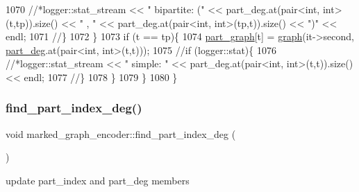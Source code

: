 \begin{DoxyCode}
1070       \textcolor{comment}{//*logger::stat\_stream << " bipartite: (" << part\_deg.at(pair<int, int> (t,tp)).size() << " , " <<
       part\_deg.at(pair<int, int>(tp,t)).size() << ")" << endl;}
1071       \textcolor{comment}{//\}}
1072     \}
1073     \textcolor{keywordflow}{if} (t == tp)\{
1074       \hyperlink{classmarked__graph__encoder_adbafd0769ae301acc1b2c19b5e1d4844}{part\_graph}[t] = \hyperlink{classgraph}{graph}(it->second, \hyperlink{classmarked__graph__encoder_a55ea2edb2609dfc287432f61900d6ad1}{part\_deg}.at(pair<int, int>(t,t)));
1075       \textcolor{comment}{//if (logger::stat)\{}
1076       \textcolor{comment}{//*logger::stat\_stream << " simple: "  << part\_deg.at(pair<int, int>(t,t)).size() << endl;}
1077       \textcolor{comment}{//\}}
1078     \}
1079   \}
1080 \}
\end{DoxyCode}
\mbox{\label{classmarked__graph__encoder_a1cb2cd754108302a0437a924dc70bc0e}} 
\subsubsection{\texorpdfstring{find\+\_\+part\+\_\+index\+\_\+deg()}{find\_part\_index\_deg()}}
{\footnotesize\ttfamily void marked\+\_\+graph\+\_\+encoder\+::find\+\_\+part\+\_\+index\+\_\+deg (\begin{DoxyParamCaption}{ }\end{DoxyParamCaption})\hspace{0.3cm}{\ttfamily [private]}}



update part\+\_\+index and part\+\_\+deg members 


